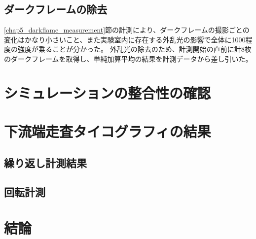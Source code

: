 \subsection{ダークフレームの除去}
\ref{chap5_darkflame_measurement}節の計測により、ダークフレームの撮影ごとの変化はかなり小さいこと、また実験室内に存在する外乱光の影響で全体に1000程度の強度が乗ることが分かった。
外乱光の除去のため、計測開始の直前に計8枚のダークフレームを取得し、単純加算平均の結果を計測データから差し引いた。

\clearpage
\newpage

\section{シミュレーションの整合性の確認}
\label{chap5_simulation_validity}




\clearpage

\newpage

\section{下流端走査タイコグラフィの結果}
\label{chap5_mirror_transverse_result}


\subsection{繰り返し計測結果}
\label{chap5_mirror_transverse_result_repeat}


\subsection{回転計測}
\label{chap5_mirror_transverse_result_rotation}


\section{結論}
\label{chap5_conclusion}



